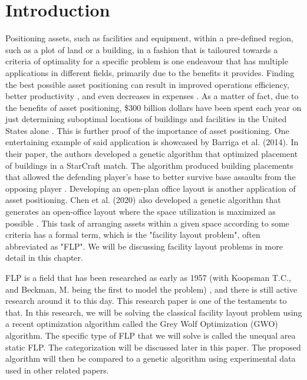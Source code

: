 \chapter{Introduction} \label{sec:intro}
Positioning assets, such as facilities and equipment, within a pre-defined region, such as a plot of land or a building, in a fashion that is tailoured towards a criteria of optimality for a specific problem is one endeavour that has multiple applications in different fields, primarily due to the benefits it provides. Finding the best possible asset positioning can result in improved operations efficiency, better productivity \cite{El-Baz2004}, and even decreases in expenses \cite{Sahin2011}. As a matter of fact, due to the benefits of asset positioning, \$300 billion dollars have been spent each year on just determining suboptimal locations of buildings and facilities in the United States alone \cite{Asl2015a}. This is further proof of the importance of asset positioning. One entertaining example of said application is showcased by Barriga et al. (2014). In their paper, the authors developed a genetic algorithm that optimized placement of buildings in a StarCraft match. The algorithm produced building placements that allowed the defending player's base to better survive base assaults from the opposing player \cite{Barriga2014}. Developing an open-plan office layout is another application of asset positioning. Chen et al. (2020) also developed a genetic algorithm that generates an open-office layout where the space utilization is maximized as possible \cite{Chen2020}. This task of arranging assets within a given space according to some criteria has a formal term, which is the "facility layout problem", often abbreviated as "FLP". We will be discussing facility layout problems in more detail in this chapter.

FLP is a field that has been researched as early as 1957 (with Koopsman T.C., and Beckman, M. being the first to model the problem) \cite{Kusiak1987}, and there is still active research around it to this day. This research paper is one of the testaments to that. In this research, we will be solving the classical facility layout problem using a recent optimization algorithm called the Grey Wolf Optimization (GWO) algorithm. The specific type of FLP that we will solve is called the unequal area static FLP. The categorization will be discussed later in this paper. The proposed algorithm will then be compared to a genetic algorithm using experimental data used in other related papers.

